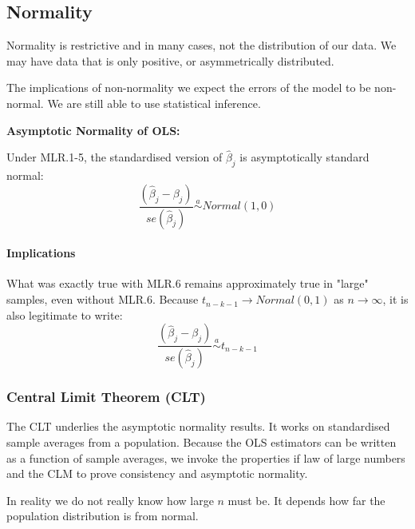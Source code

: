 \documentclass[11pt]{article}
\begin{document}
\subsection{Normality}
Normality is restrictive and in many cases, not the distribution of our data. We may have data that is only positive, or asymmetrically distributed.

The implications of non-normality we expect the errors of the model to be non-normal. We are still able to use statistical inference.

\newpage

\begin{shaded}
    \begin{theorem}
        \textbf{Asymptotic Normality of OLS:}

        Under MLR.1-5, the standardised version of $\hat{\beta}_j$ is asymptotically standard normal:
        \begin{equation}
            \label{asymptotic standard normal beta}
            \dfrac{(\hat{\beta}_j-\beta_j)}{se(\hat{\beta}_j)} \overset{a}{\sim} Normal(1,0)
        \end{equation}
    \end{theorem}
\end{shaded}

\paragraph{Implications}

What was exactly true with MLR.6 remains approximately true in "large" samples, even without MLR.6. Because $t_{n-k-1}\rightarrow Normal(0,1)$ as $n\rightarrow\infty$, it is also legitimate to write:
\[\dfrac{(\hat{\beta}_j-\beta_j)}{se(\hat{\beta}_j)} \overset{a}{\sim} t_{n-k-1}\]

\subsubsection{Central Limit Theorem (CLT)}

The CLT underlies the asymptotic normality results. It works on standardised sample averages from a population. Because the OLS estimators can be written as a function of sample averages, we invoke the properties if law of large numbers and the CLM to prove consistency and asymptotic normality.

In reality we do not really know how large $n$ must be. It depends how far the population distribution is from normal.
\end{document}
